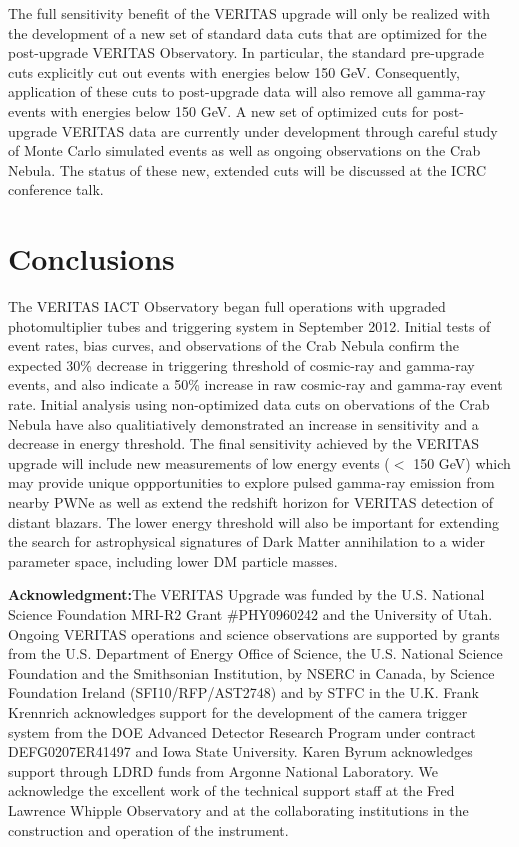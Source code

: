 \documentclass[a4paper]{article}
\begin{document}
The full sensitivity benefit of the VERITAS upgrade will only be realized with the development of a new set of standard data cuts  that are optimized for the post-upgrade VERITAS Observatory. In particular, the standard pre-upgrade  cuts explicitly cut out events with energies below 150 GeV.
Consequently, application of these cuts to post-upgrade data will also remove all gamma-ray events with energies below 150 GeV. A new set of optimized cuts for post-upgrade VERITAS data are currently under development through careful study of Monte Carlo simulated events as well as  ongoing  observations on the Crab Nebula. The status of these new, extended cuts will be discussed at the ICRC conference talk. 


\section{Conclusions}
The VERITAS IACT Observatory began full operations with upgraded photomultiplier tubes and triggering system in September 2012. Initial tests of event rates, bias curves, and observations of the Crab Nebula confirm the expected 30\% decrease in triggering threshold of cosmic-ray and gamma-ray events, and also indicate a 50\% increase in raw cosmic-ray and gamma-ray event rate. Initial analysis using non-optimized data cuts on obervations of the Crab Nebula  have also qualitiatively  demonstrated an increase in sensitivity and a decrease in energy threshold. The final sensitivity achieved by the VERITAS upgrade will include new measurements of low energy events ($<$ 150 GeV) which may  provide  unique oppportunities to explore pulsed gamma-ray emission from nearby PWNe \cite{bib:CrabPulsedVERITAS} as well as extend the redshift horizon for  VERITAS detection of distant blazars\cite{bib:Blazar2013}. The lower energy threshold will also be important for extending the search for astrophysical signatures of Dark Matter annihilation\cite{bib:DM2012} to a wider parameter space, including lower DM particle masses. 


\vspace*{0.9cm}
\footnotesize{{\bf Acknowledgment:}{The VERITAS Upgrade was funded by the U.S. National Science Foundation MRI-R2 Grant  \#PHY0960242 and the  University of Utah. Ongoing VERITAS operations and science observations are supported by grants
from the U.S. Department of Energy Office of Science, the
U.S. National Science Foundation and the Smithsonian Institution, by NSERC in Canada, by Science Foundation Ireland (SFI10/RFP/AST2748) and by STFC in the U.K. 
Frank Krennrich acknowledges support for the development of the camera trigger system from the DOE Advanced Detector  Research Program under contract DEFG0207ER41497 and Iowa State University. Karen Byrum acknowledges support through  LDRD funds from Argonne National Laboratory. We acknowledge the excellent work of the technical support staff at the Fred Lawrence Whipple Observatory and at the collaborating institutions in the construction and operation of the instrument.}}
\end{document}
